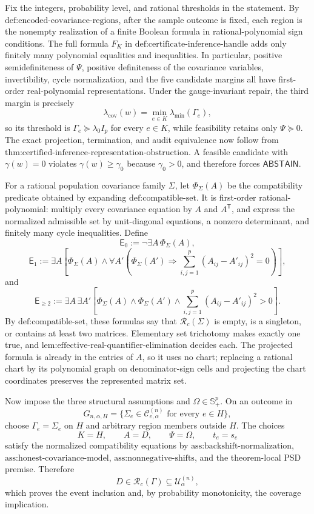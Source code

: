 Fix the integers, probability level, and rational thresholds in the statement. By \(\text{def:encoded-covariance-regions}\), after the sample outcome is fixed, each region is the nonempty realization of a finite Boolean formula in rational-polynomial sign conditions. The full formula \(F_K\) in \(\text{def:certificate-inference-handle}\) adds only finitely many polynomial equalities and inequalities. In particular, positive semidefiniteness of \(\Psi\), positive definiteness of the covariance variables, invertibility, cycle normalization, and the five candidate margins all have first-order real-polynomial representations. Under the gauge-invariant repair, the third margin is precisely
\[
\lambda_{\mathrm{cov}}(w)=\min_{e\in K}\lambda_{\min}(\Gamma_e),
\]
so its threshold is \(\Gamma_e\succeq\lambda_0I_p\) for every \(e\in K\), while feasibility retains only \(\Psi\succeq0\). The exact projection, termination, and audit equivalence now follow from \(\text{thm:certified-inference-representation-obstruction}\). A feasible candidate with \(\gamma(w)=0\) violates \(\gamma(w)\geq\gamma_0\) because \(\gamma_0>0\), and therefore forces \(\mathsf{ABSTAIN}\).

For a rational population covariance family \(\Sigma\), let \(\Phi_\Sigma(A)\) be the compatibility predicate obtained by expanding \(\text{def:compatible-set}\). It is first-order rational-polynomial: multiply every covariance equation by \(A\) and \(A^{\mathsf T}\), and express the normalized admissible set by unit-diagonal equations, a nonzero determinant, and finitely many cycle inequalities. Define
\[
\mathsf E_0:=\neg\exists A\,\Phi_\Sigma(A),
\]
\[
\mathsf E_1:=\exists A\left[\Phi_\Sigma(A)\wedge
\forall A'\left(\Phi_\Sigma(A')\Rightarrow
\sum_{i,j=1}^p(A_{ij}-A'_{ij})^2=0\right)\right],
\]
and
\[
\mathsf E_{\geq2}:=\exists A\,\exists A'\left[
\Phi_\Sigma(A)\wedge\Phi_\Sigma(A')\wedge
\sum_{i,j=1}^p(A_{ij}-A'_{ij})^2>0\right].
\]
By \(\text{def:compatible-set}\), these formulas say that \(\mathcal R_c(\Sigma)\) is empty, is a singleton, or contains at least two matrices. Elementary set trichotomy makes exactly one true, and \(\text{lem:effective-real-quantifier-elimination}\) decides each. The projected formula is already in the entries of \(A\), so it uses no chart; replacing a rational chart by its polynomial graph on denominator-sign cells and projecting the chart coordinates preserves the represented matrix set.

Now impose the three structural assumptions and \(\Omega\in\mathbb S_+^p\). On an outcome in
\[
G_{n,\alpha,H}=\{\Sigma_e\in\mathcal C^{(n)}_{e,\alpha}\text{ for every }e\in H\},
\]
choose \(\Gamma_e=\Sigma_e\) on \(H\) and arbitrary region members outside \(H\). The choices
\[
K=H,\qquad A=D,\qquad \Psi=\Omega,\qquad t_e=s_e
\]
satisfy the normalized compatibility equations by \(\text{ass:backshift-normalization}\), \(\text{ass:honest-covariance-model}\), \(\text{ass:nonnegative-shifts}\), and the theorem-local PSD premise. Therefore
\[
D\in\mathcal R_c(\Gamma)\subseteq\mathcal U^{(n)}_\alpha,
\]
which proves the event inclusion and, by probability monotonicity, the coverage implication.

